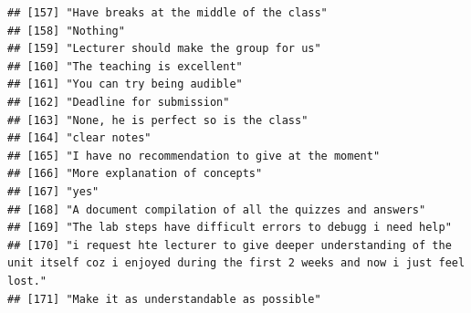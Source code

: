 \documentclass[
]{article}
\begin{document}
\begin{verbatim}
## [157] "Have breaks at the middle of the class"                                                                                                                                                                                
## [158] "Nothing"                                                                                                                                                                                                               
## [159] "Lecturer should make the group for us"                                                                                                                                                                                 
## [160] "The teaching is excellent"                                                                                                                                                                                             
## [161] "You can try being audible"                                                                                                                                                                                             
## [162] "Deadline for submission"                                                                                                                                                                                               
## [163] "None, he is perfect so is the class"                                                                                                                                                                                   
## [164] "clear notes"                                                                                                                                                                                                           
## [165] "I have no recommendation to give at the moment"                                                                                                                                                                        
## [166] "More explanation of concepts"                                                                                                                                                                                          
## [167] "yes"                                                                                                                                                                                                                   
## [168] "A document compilation of all the quizzes and answers"                                                                                                                                                                 
## [169] "The lab steps have difficult errors to debugg i need help"                                                                                                                                                             
## [170] "i request hte lecturer to give deeper understanding of the unit itself coz i enjoyed during the first 2 weeks and now i just feel lost."                                                                               
## [171] "Make it as understandable as possible"
\end{verbatim}
\end{document}
